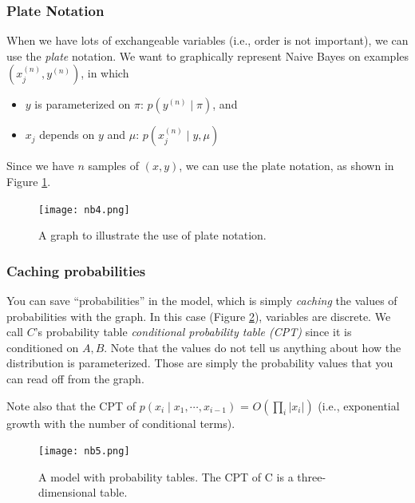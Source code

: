 \documentclass{article}
\begin{document}
\FloatBarrier
\subsubsection{Plate Notation}
When we have lots of exchangeable variables (i.e., order is not important), we can use the \emph{plate} notation.
We want to graphically represent Naive Bayes on examples $(x_j^{(n)}, y^{(n)})$, in which
\begin{itemize}
\item $y$ is parameterized on $\pi$: $p(y^{(n)} \mid \pi)$, and
\item $x_{j}$ depends on $y$ and $\mu$: $p(x_{j}^{(n)} \mid y, \mu)$
\end{itemize}
Since we have $n$ samples of $(x, y)$, we can use the plate notation, as shown in Figure \ref{fig:nb4}.
\begin{figure}[!ht]
    \centering
    \texttt{[image: nb4.png]}
    \caption{A graph to illustrate the use of plate notation.}
    \label{fig:nb4}
\end{figure}
\FloatBarrier


\subsubsection{Caching probabilities}
You can save ``probabilities'' in the model, which is simply \emph{caching} the values of probabilities with the graph. 
In this case (Figure \ref{fig:nb5}), variables are discrete. We call $C$'s probability table \emph{conditional probability table (CPT)} since it is conditioned on $A, B$. Note that the values do not tell us anything about how the distribution is parameterized. Those are simply the probability values that you can read off from the graph.

Note also that the CPT of $p(x_{i} \mid x_{1}, \cdots, x_{i - 1})$ = $O(\prod_{i} |x_{i} |)$ (i.e., exponential growth with the number of conditional terms). 
\begin{figure}[!ht]
    \centering
    \texttt{[image: nb5.png]}
    \caption{A model with probability tables. The CPT of C is a three-dimensional table.}
    \label{fig:nb5}
\end{figure}



\FloatBarrier
\end{document}
